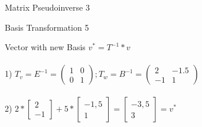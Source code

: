 \begin{questions}
\begin{question}{Matrix Pseudoinverse }{3}
	\end{question}
	\begin{question}{Basis Transformation }{5}		
	\begin{answer} 
		Vector with new Basis $v^* = T^{-1} * v$\\\\
	1) $T_v = E^{-1} = \begin{pmatrix}
		1 & 0\\
		0 & 1
	\end{pmatrix};
	T_w = B^{-1} = \begin{pmatrix}
		 2 & -1.5\\
		-1 & 1
	\end{pmatrix}$\\\\
	2) $2 * \begin{bmatrix}
		2 \\
		-1
	\end{bmatrix}
	+ 5 * \begin{bmatrix}
		-1,5 \\
		 1
	\end{bmatrix}
	 = \begin{bmatrix}
	 	-3,5 \\
	 	 3
	 \end{bmatrix} = v^*$
		
	\end{answer}
		
	\end{question}
	
\end{questions}
	

